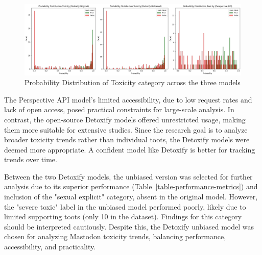 \begin{figure}[tb]
    \centering
    \includegraphics[width=\textwidth]{../material/probability_distribution.png}
    \caption{Probability Distribution of Toxicity category across the three models}
    \label{probability-distribution}
\end{figure}

The Perspective API model's limited accessibility, due to low request rates and lack of open access, posed practical constraints for large-scale analysis. In contrast, the open-source Detoxify models offered unrestricted usage, making them more suitable for extensive studies. Since the research goal is to analyze broader toxicity trends rather than individual toots, the Detoxify models were deemed more appropriate. A confident model like Detoxify is better for tracking trends over time.

Between the two Detoxify models, the unbiased version was selected for further analysis due to its superior performance (Table~\ref{table-performance-metrics}) and inclusion of the "sexual explicit" category, absent in the original model. However, the "severe toxic" label in the unbiased model performed poorly, likely due to limited supporting toots (only 10 in the dataset). Findings for this category should be interpreted cautiously. Despite this, the Detoxify unbiased model was chosen for analyzing Mastodon toxicity trends, balancing performance, accessibility, and practicality.

